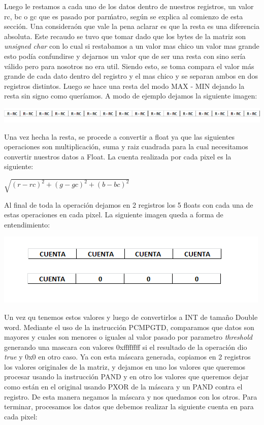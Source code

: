 Luego le restamos a cada uno de los datos dentro de nuestros registros, un valor rc, bc o gc que es pasado por par\'matro, seg\'un se explica al
comienzo de esta secci\'on. Una considera\'on que vale la pena aclarar es que la resta es una diferencia absoluta. Este recaudo se tuvo que tomar dado 
que los bytes de la matriz son \emph{unsigned char} con lo cual si restabamos a un valor mas chico un valor mas grande esto pod\'ia confundirse y dejarnos
un valor que de ser una resta con sino ser\'ia v\'alido pero para nosotros no era util. Siendo esto, se toma compara el valor m\'as grande de cada dato
dentro del registro y el mas chico y se separan ambos en dos registros distintos. Luego se hace una resta del modo MAX - MIN dejando la resta sin signo
como quer\'iamos. A modo de ejemplo dejamos la siguiente imagen:

\begin{center}
\includegraphics[width=16cm]{imagenes/resta.png} 
\end{center}

Una vez hecha la resta, se procede a convertir a float ya que las siguientes operaciones son multiplicaci\'on, suma y raiz cuadrada para la cual necesitamos
convertir nuestros datos a Float. La cuenta realizada por cada pixel es la siguiente:

\begin{center}
 $\sqrt{(r - rc)^2 + (g - gc)^2 + (b - bc)^2}$
\end{center}

Al final de toda la operaci\'on dejamos en 2 registros los 5 floats con cada una de estas operaciones en cada pixel. La siguiente imagen queda a forma de
entendimiento:

\begin{center}
\includegraphics{imagenes/FinOperacion.png} 
\end{center}
 Un vez qu tenemos estos valores y luego de convertirlos a INT de tamaño Double word. Mediante el uso de la instrucci\'on PCMPGTD, comparamos que datos son
mayores y cuales son menores o iguales al valor pasado por parametro \emph{threshold} generando una mascara con valores 0xffffffff si el resultado de la 
operaci\'on dio \emph{true} y 0x0 en otro caso.\newline
Ya con esta m\'ascara generada, copiamos en 2 registros los valores originales de la matriz, y dejamos en uno los valores que queremos procesar usando la
instrucci\'on PAND y en otro los valores que queremos dejar como est\'an en el original usando PXOR de la m\'ascara y un PAND contra el registro. De esta
 manera negamos la m\'ascara y nos quedamos con los otros.\newline
Para terminar, procesamos los datos que debemos realizar la siguiente cuenta en para cada pixel:

